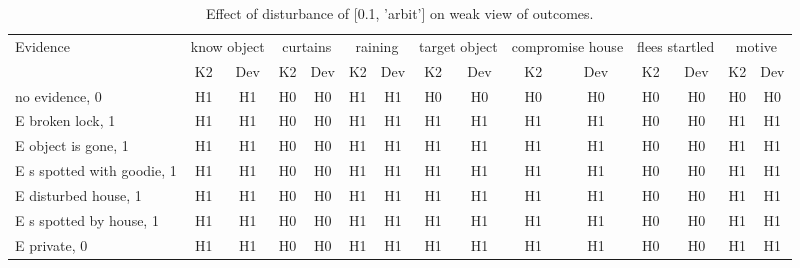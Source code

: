 \begin{table}\begin{tabular}{l|cc|cc|cc|cc|cc|cc|cc}\toprule\multirow{2}{*}{Evidence} & \multicolumn{2}{c}{know object}& \multicolumn{2}{c}{curtains}& \multicolumn{2}{c}{raining}& \multicolumn{2}{c}{target object}& \multicolumn{2}{c}{compromise house}& \multicolumn{2}{c}{flees startled}& \multicolumn{2}{c}{motive}\\& {K2} & {Dev}& {K2} & {Dev}& {K2} & {Dev}& {K2} & {Dev}& {K2} & {Dev}& {K2} & {Dev}& {K2} & {Dev}\\\midrule
no evidence, 0 & H1&H1&H0&H0&H1&H1&H0&H0&H0&H0&H0&H0&H0&H0\\E broken lock, 1 & H1&H1&H0&H0&H1&H1&H1&H1&H1&H1&H0&H0&H1&H1\\E object is gone, 1 & H1&H1&H0&H0&H1&H1&H1&H1&H1&H1&H0&H0&H1&H1\\E s spotted with goodie, 1 & H1&H1&H0&H0&H1&H1&H1&H1&H1&H1&H0&H0&H1&H1\\E disturbed house, 1 & H1&H1&H0&H0&H1&H1&H1&H1&H1&H1&H0&H0&H1&H1\\E s spotted by house, 1 & H1&H1&H0&H0&H1&H1&H1&H1&H1&H1&H0&H0&H1&H1\\E private, 0 & H1&H1&H0&H0&H1&H1&H1&H1&H1&H1&H0&H0&H1&H1\\\bottomrule\end{tabular}\caption{Effect of disturbance of [0.1, 'arbit'] on weak view of outcomes.}\end{table}